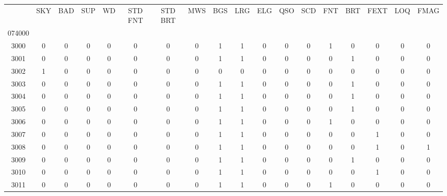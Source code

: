 \begin{tabular}{|c|c|c|c|c|c|c|c|c|c|c|c|c|c|c|c|c|c|}\toprule{} &  SKY &  BAD &  SUP &  WD &  STD FNT &  STD BRT &  MWS &  BGS &  LRG &  ELG &  QSO &  SCD &  FNT &  BRT &  FEXT &  LOQ &  FMAG \\074000 &      &      &      &     &          &          &      &      &      &      &      &      &      &      &       &      &       \\\midrule3000   &    0 &    0 &    0 &   0 &        0 &        0 &    0 &    1 &    1 &    0 &    0 &    0 &    1 &    0 &     0 &    0 &     0 \\
\midrule
3001   &    0 &    0 &    0 &   0 &        0 &        0 &    0 &    1 &    1 &    0 &    0 &    0 &    0 &    1 &     0 &    0 &     0 \\
\midrule
3002   &    1 &    0 &    0 &   0 &        0 &        0 &    0 &    0 &    0 &    0 &    0 &    0 &    0 &    0 &     0 &    0 &     0 \\
\midrule
3003   &    0 &    0 &    0 &   0 &        0 &        0 &    0 &    1 &    1 &    0 &    0 &    0 &    0 &    1 &     0 &    0 &     0 \\
\midrule
3004   &    0 &    0 &    0 &   0 &        0 &        0 &    0 &    1 &    1 &    0 &    0 &    0 &    0 &    1 &     0 &    0 &     0 \\
\midrule
3005   &    0 &    0 &    0 &   0 &        0 &        0 &    0 &    1 &    1 &    0 &    0 &    0 &    0 &    1 &     0 &    0 &     0 \\
\midrule
3006   &    0 &    0 &    0 &   0 &        0 &        0 &    0 &    1 &    1 &    0 &    0 &    0 &    1 &    0 &     0 &    0 &     0 \\
\midrule
3007   &    0 &    0 &    0 &   0 &        0 &        0 &    0 &    1 &    1 &    0 &    0 &    0 &    0 &    0 &     1 &    0 &     0 \\
\midrule
3008   &    0 &    0 &    0 &   0 &        0 &        0 &    0 &    1 &    1 &    0 &    0 &    0 &    0 &    0 &     1 &    0 &     1 \\
\midrule
3009   &    0 &    0 &    0 &   0 &        0 &        0 &    0 &    1 &    1 &    0 &    0 &    0 &    0 &    1 &     0 &    0 &     0 \\
\midrule
3010   &    0 &    0 &    0 &   0 &        0 &        0 &    0 &    1 &    1 &    0 &    0 &    0 &    0 &    0 &     1 &    0 &     0 \\
\midrule
3011   &    0 &    0 &    0 &   0 &        0 &        0 &    0 &    1 &    1 &    0 &    0 &    0 &    1 &    0 &     0 &    0 &     0 \\

\end{tabular}
